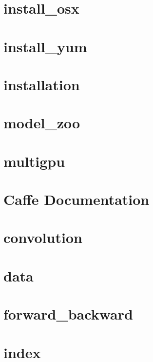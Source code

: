 \documentclass[twoside]{book}
\newcommand{\+}{\discretionary{\mbox{\scriptsize$\hookleftarrow$}}{}{}}
\begin{document}
\chapter{install\+\_\+osx}
\label{md_docs_install_osx}

\chapter{install\+\_\+yum}
\label{md_docs_install_yum}

\chapter{installation}
\label{md_docs_installation}

\chapter{model\+\_\+zoo}
\label{md_docs_model_zoo}

\chapter{multigpu}
\label{md_docs_multigpu}

\chapter{Caffe Documentation}
\label{md_docs__r_e_a_d_m_e}

\chapter{convolution}
\label{md_docs_tutorial_convolution}

\chapter{data}
\label{md_docs_tutorial_data}

\chapter{forward\+\_\+backward}
\label{md_docs_tutorial_forward_backward}

\chapter{index}
\label{md_docs_tutorial_index}

\end{document}
